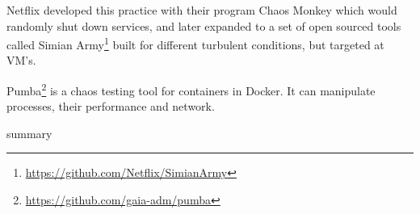 Netflix developed this practice with their program Chaos Monkey which would randomly shut down services, and later expanded to a set of open sourced tools called Simian Army\footnote{\url{https://github.com/Netflix/SimianArmy}} built for different turbulent conditions, but targeted at \acs{VM}'s.

Pumba\footnote{\url{https://github.com/gaia-adm/pumba}} is a chaos testing tool for containers in Docker. It can manipulate processes, their performance and network.

summary


